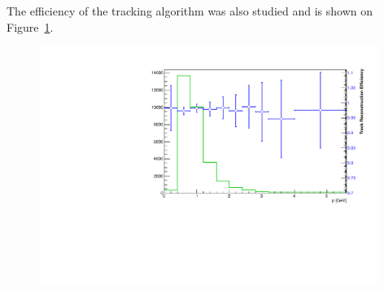The efficiency of the tracking algorithm was also studied and is shown on 
Figure~\ref{fig:trk_efficiency}.
\begin{figure}[h]
    \begin{center}
    	\includegraphics[width=0.98\textwidth]{test2012/svtperformance/trk_performance/track_reco_efficiency.pdf}
        \caption{} 
	\label{fig:trk_efficiency}
    \end{center}
\end{figure}
